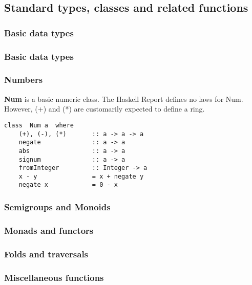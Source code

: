 %

\subsection{Standard types, classes and related functions}

\subsubsection{Basic data types}

\subsubsection{Basic data types}

\subsubsection{Numbers}

\textbf{Num} is a basic numeric class.
The Haskell Report defines no laws for Num.
However, (+) and (*) are customarily expected to define a ring.
\begin{verbatim}
class  Num a  where
    (+), (-), (*)       :: a -> a -> a
    negate              :: a -> a
    abs                 :: a -> a
    signum              :: a -> a
    fromInteger         :: Integer -> a
    x - y               = x + negate y
    negate x            = 0 - x
\end{verbatim}


\subsubsection{Semigroups and Monoids}

\subsubsection{Monads and functors}

\subsubsection{Folds and traversals}

\subsubsection{Miscellaneous functions}

%